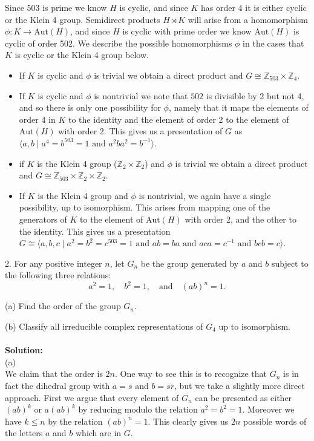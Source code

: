 \documentclass[11pt]{article}
\newcommand{\Z}{\mathbb{Z}}
\begin{document}
Since 503 is prime we know $H$ is cyclic, and since $K$ has order 4 it is either cyclic or the Klein 4 group. Semidirect products $H\rtimes K$ will arise from a homomorphism $\phi:K\to \mbox{Aut}(H)$, and since $H$ is cyclic with prime order we know $\mbox{Aut}(H)$ is cyclic of order 502. We describe the possible homomorphisms $\phi$ in the cases that $K$ is cyclic or the Klein 4 group below. \begin{itemize}
\item If $K$ is cyclic and $\phi$ is trivial we obtain a direct product and $G\cong \Z_{503}\times \Z_4$. 
\item If $K$ is cyclic and $\phi$ is nontrivial we note that $502$ is divisible by 2 but not 4, and so there is only one possibility for $\phi$, namely that it maps the elements of order 4 in $K$ to the identity  and the element of order 2 to the element of $\mbox{Aut}(H)$ with order 2. This gives us a presentation of $G$ as $\langle a,b \mid a^4 = b^{503} = 1 \text{ and } a^2ba^2 = b^{-1}\rangle$.
\item if $K$ is the Klein 4 group ($\Z_2\times \Z_2$) and $\phi$ is trivial we obtain a direct product and $G\cong \Z_{503}\times \Z_2\times \Z_2$.
\item If $K$ is the Klein 4 group and $\phi$ is nontrivial, we again have a single possibility, up to isomorphism. This arises from mapping one of the generators of $K$ to the element of $\mbox{Aut}(H)$ with order 2, and the other to the identity. This gives us a presentation $G\cong \langle a,b,c \mid a^2 = b^2 = c^{503} = 1\text{ and } ab = ba \text{ and } aca = c^{-1} \text{ and } bcb = c\rangle$. 
\end{itemize}



\newpage


2. For any positive integer $n$, let $G_n$ be the group generated by $a$ and $b$ subject to the following three
relations:\[
a^2=1,\quad b^2=1,\quad\text{and}\quad (ab)^n=1.
\]

(a) Find the order of the group $G_n$.

(b) Classify all irreducible complex representations of $G_4$ up to isomorphism.\\\\
\textbf{Solution:}\\
(a)\\
We claim that the order is $2n$. One way to see this is to recognize that $G_n$ is in fact the dihedral group with $a = s$ and $b = sr$, but we take a slightly more direct approach. First we argue that every element of $G_n$ can be presented as either $(ab)^k$ or $a(ab)^k$  by reducing modulo the relation $a^2=b^2=1$. Moreover we have $k\le n$ by the relation $(ab)^n = 1$. This clearly gives us $2n$ possible words of the letters $a$ and $b$ which are in $G$.
\end{document}
